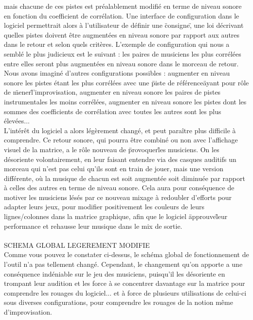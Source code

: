 mais chacune de ces pistes est préalablement modifié en terme de
niveau sonore en fonction du coefficient de corrélation. Une interface
de configuration dans le logiciel permettrait alors à l'utilisateur de
définir une \"consigne\", une loi décrivant quelles pistes doivent
être augmentées en niveau sonore par rapport aux autres dans le retour
et selon quels critères. L'exemple de configuration qui nous a semblé
le plus judicieux est le suivant : les paires de musiciens les plus
corrélées entre elles seront plus augmentées en niveau sonore dans le
morceau de retour. Nous avons imaginé d'autres configurations
possibles : augmenter en niveau sonore les pistes étant les plus
corrélées avec une \"piste de référence\" ayant pour rôle de \"mener\"
l'improvisation, augmenter en niveau sonore les paires de pistes
instrumentales les moins corrélées, augmenter en niveau sonore les
pistes dont les sommes des coefficients de corrélation avec toutes les
autres sont les plus élevées... \\
L'intérêt du logiciel a alors légèrement changé, et peut paraître plus
difficile à comprendre. Ce retour sonore, qui pourra être combiné ou
non avec l'affichage visuel de la matrice, a le rôle nouveau de
\"provoquer\" les musiciens. On les désoriente volontairement, en leur
faisant entendre via des casques auditifs un morceau qui n'est pas
celui qu'ils sont en train de jouer, mais une version différente, où
la musique de chacun est soit augmentée soit diminuée par rapport à
celles des autres en terme de niveau sonore. Cela aura pour
conséquence de motiver les musiciens lésés par ce nouveau mixage à
redoubler d'efforts pour adapter leurs jeux, pour modifier
positivement les couleurs de leurs lignes/colonnes dans la matrice
graphique, afin que le logiciel \"approuve\" leur performance et
rehausse leur musique dans le mix de sortie. \\
\\
SCHEMA GLOBAL LEGEREMENT MODIFIE
\\
Comme vous pouvez le constater ci-dessus, le schéma global de
fonctionnement de l'outil n'a pas tellement changé. Cependant, le
changement qu'on apporte a une conséquence indéniable sur le jeu des
musiciens, puisqu'il les désoriente en trompant leur audition et les
force à se concentrer davantage sur la matrice pour comprendre les
rouages du logiciel... et à force de plusieurs utilisations de
celui-ci sous diverses configurations, pour comprendre les rouages de
la notion même d'improvisation. \\

